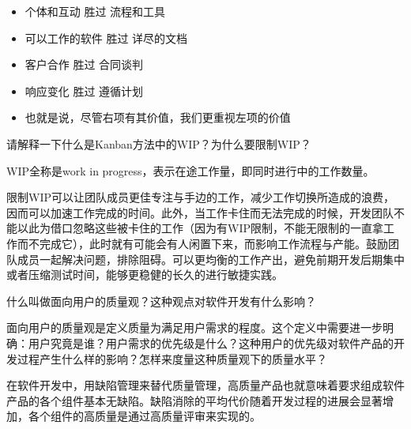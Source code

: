 \begin{solution}
    \vspace{-0.8em}
    \begin{multicols}{2}
        \begin{itemize}
            \item 个体和互动 胜过 流程和工具
            \item 可以工作的软件 胜过 详尽的文档
            \item 客户合作 胜过 合同谈判
            \item 响应变化 胜过 遵循计划
        \end{itemize}
    \end{multicols}
    \vspace{-1em}
    \vspace{-0.4em}
    \begin{itemize}
        \item 也就是说，尽管右项有其价值，我们更重视左项的价值
    \end{itemize}
\end{solution}



\begin{problem}
请解释一下什么是Kanban方法中的WIP？为什么要限制WIP？
\end{problem}

\begin{solution}
WIP全称是work in progress，表示在途工作量，即同时进行中的工作数量。

限制WIP可以让团队成员更佳专注与手边的工作，减少工作切换所造成的浪费，因而可以加速工作完成的时间。此外，当工作卡住而无法完成的时候，开发团队不能以此为借口忽略这些被卡住的工作（因为有WIP限制，不能无限制的一直拿工作而不完成它），此时就有可能会有人闲置下来，而影响工作流程与产能。鼓励团队成员一起解决问题，排除阻碍。可以更均衡的工作产出，避免前期开发后期集中或者压缩测试时间，能够更稳健的长久的进行敏捷实践。
\end{solution}



\begin{problem}
什么叫做面向用户的质量观？这种观点对软件开发有什么影响？
\end{problem}

\begin{solution}
 面向用户的质量观是定义质量为满足用户需求的程度。这个定义中需要进一步明确：用户究竟是谁？用户需求的优先级是什么？这种用户的优先级对软件产品的开发过程产生什么样的影响？怎样来度量这种质量观下的质量水平？

在软件开发中，用缺陷管理来替代质量管理，高质量产品也就意味着要求组成软件产品的各个组件基本无缺陷。缺陷消除的平均代价随着开发过程的进展会显著增加，各个组件的高质量是通过高质量评审来实现的。
\end{solution}



